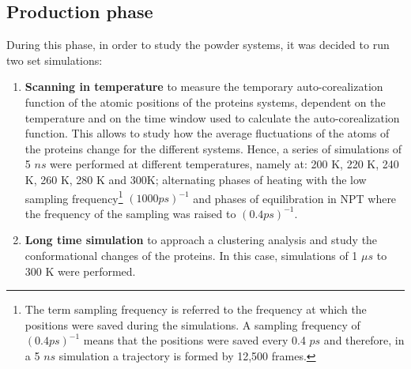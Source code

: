 \subsection{Production phase}
During this phase, in order to study the powder systems, it was decided to run two set simulations:
\begin{enumerate}
\item \textbf{Scanning in temperature} to measure the temporary auto-corealization function of the atomic positions of the proteins systems, dependent on the temperature and on the time window used to calculate the auto-corealization function. This allows to study how the average fluctuations of the atoms of the proteins change for the different systems. Hence, a series of simulations of 5 $ns$ were performed at different temperatures, namely at: 200 K, 220 K, 240 K, 260 K, 280 K and 300K; alternating phases of heating with the low sampling frequency\footnote{The term sampling frequency is referred to the frequency at which the positions were saved during the simulations. A sampling frequency of $(0.4 ps)^{-1}$ means that the positions were saved every 0.4 $ps$ and therefore, in a 5 $ns$ simulation a trajectory is formed by 12,500 frames.} $(1000 ps)^{-1}$ and phases of equilibration in NPT where the frequency of the sampling was raised to $(0.4 ps)^{-1}$.
\item \textbf{Long time simulation} to approach a clustering analysis and study the conformational changes of the proteins. In this case, simulations of 1 $\mu s$ to 300 K were performed.%
\end{enumerate}
